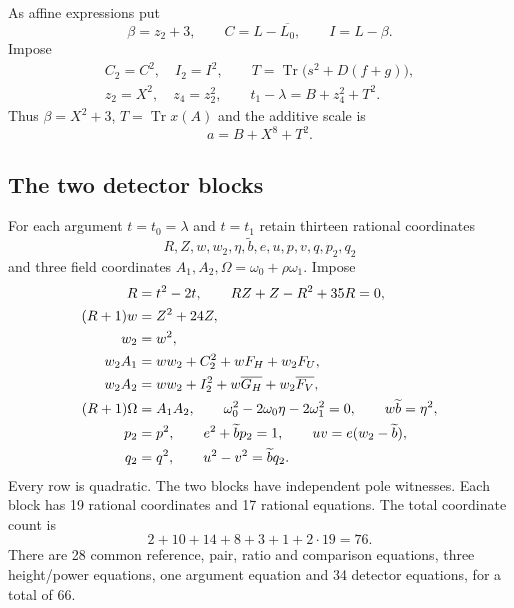 \documentclass[11pt,a4paper]{article}
\theoremstyle{remark}\newtheorem{remark}[theorem]{Remark}
\DeclareMathOperator{\Tr}{Tr}\DeclareMathOperator{\Nm}{N}
\begin{document}
As affine expressions put
\[
 \beta=z_2+3,\qquad C=L-\overline{L_0},\qquad I=L-\beta.
\]
Impose
\begin{equation}\label{eq:commonrows}
 \begin{gathered}
 C_2=C^2,\quad I_2=I^2,\qquad
 T=\Tr\bigl(s^2+D(f+g)\bigr),\\
 z_2=X^2,\quad z_4=z_2^2,\qquad
 t_1-\lambda=B+z_4^2+T^2.
 \end{gathered}
\end{equation}
Thus $\beta=X^2+3$, $T=\Tr x(A)$ and the additive scale is
\begin{equation}\label{eq:scale}
                         a=B+X^8+T^2.
\end{equation}

\subsection{The two detector blocks}
For each argument $t=t_0=\lambda$ and $t=t_1$ retain thirteen rational
coordinates
\[
 R,Z,w,w_2,\eta,\widetilde b,e,u,p,v,q,p_2,q_2
\]
and three field coordinates $A_1,A_2,\Omega=\omega_0+\rho\omega_1$.
Impose
\begin{align}
 R&=t^2-2t,\qquad RZ+Z-R^2+35R=0,\notag\\
 (R+1)w&=Z^2+24Z,\notag\\
 w_2&=w^2,\label{eq:contactrows}\\
 w_2A_1&=ww_2+C_2^2+wF_H+w_2F_U,\notag\\
 w_2A_2&=ww_2+I_2^2+w\overline{G_H}+w_2\overline{F_V},\label{eq:factorrows}\\
 (R+1)\Omega&=A_1A_2,\qquad
 \omega_0^2-2\omega_0\eta-2\omega_1^2=0,\qquad
 w\widetilde b=\eta^2,\label{eq:tracerows}\\
 p_2&=p^2,\qquad e^2+\widetilde b p_2=1,\qquad
 uv=e(w_2-\widetilde b),\notag\\
 q_2&=q^2,\qquad u^2-v^2=\widetilde b q_2.\label{eq:polerows}
\end{align}
Every row is quadratic. The two blocks have independent pole witnesses.
Each block has 19 rational coordinates and 17 rational equations.
The total coordinate count is
\[
                 2+10+14+8+3+1+2\cdot19=76.
\]
There are 28 common reference, pair, ratio and comparison equations,
three height/power equations, one argument equation and 34 detector
equations, for a total of 66.
\end{document}
